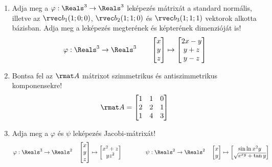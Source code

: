 \documentclass[a4paper, 12pt]{scrartcl}
\begin{document}
\begin{enumerate}
  \item Adja meg a $\varphi : \Reals^3 \to \Reals^3$ leképezés mátrixát a
        standard normális, illetve az $\rvec b_1(1; 0; 0)$, $\rvec b_2(1; 1; 0)$
        és $\rvec b_3(1; 1; 1)$ vektorok alkotta bázisban. Adja meg a leképezés
        megterének és képterének dimenzióját is!
        $$
          \varphi : \Reals^3 \to \Reals^3
          \qquad
          \begin{bmatrix}
            x \\ y \\ z
          \end{bmatrix}
          \mapsto
          \begin{bmatrix}
            2x - y \\ y + z \\ y - z
          \end{bmatrix}
        $$

  \item Bontsa fel az $\rmat A$ mátrixot szimmetrikus és antiszimmetrikus
        komponensekre!
        $$
          \rmat A = \begin{bmatrix}
            1 & 1 & 0 \\
            2 & 2 & 1 \\
            1 & 4 & 3
          \end{bmatrix}
        $$

  \item Adja meg a $\varphi$ és $\psi$ leképezés Jacobi-mátrixát!
        $$
          \varphi : \Reals^3 \to \Reals^2
          \quad
          \begin{bmatrix}
            x \\ y \\ z
          \end{bmatrix}
          \mapsto
          \begin{bmatrix}
            x^2 + z \\ y z^2
          \end{bmatrix}
          \qquad\qquad
          \psi : \Reals^2 \to \Reals^2
          \quad
          \begin{bmatrix}
            x \\ y
          \end{bmatrix}
          \mapsto
          \begin{bmatrix}
            \sin \ln x^2 y \\ \sqrt{e^{xy} + \tan y}
          \end{bmatrix}
        $$


\end{enumerate}
\end{document}
